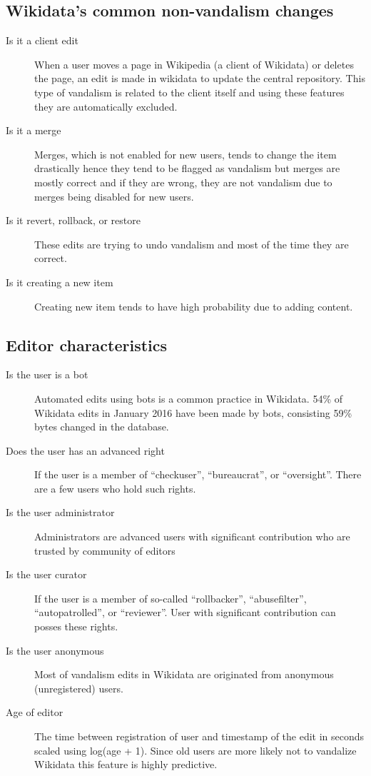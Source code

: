 \documentclass{sig-alternate}
\begin{document}
\subsection{Wikidata's common non-vandalism changes}
\begin{description}
\item[Is it a client edit] When a user moves a page in Wikipedia (a client of Wikidata) or deletes the page, an edit is made in wikidata to update the central repository. This type of vandalism is related to the client itself and using these features they are automatically excluded.
\item[Is it a merge] Merges, which is not enabled for new users, tends to change the item drastically hence they tend to be flagged as vandalism but merges are mostly correct and if they are wrong, they are not vandalism due to merges being disabled for new users.
\item[Is it revert, rollback, or restore] These edits are trying to undo vandalism and most of the time they are correct.
\item[Is it creating a new item] Creating new item tends to have high probability due to adding content.
\end{description}
\subsection{Editor characteristics}
\begin{description}
\item[Is the user is a bot]  Automated edits using bots is a common practice in Wikidata. 54\% of Wikidata edits in January 2016 have been made by bots, consisting 59\% bytes changed in the database.
\item[Does the user has an advanced right]  If the user is a member of ``checkuser'', ``bureaucrat'', or ``oversight''. There are a few users who hold such rights.
\item[Is the user administrator] Administrators are advanced users with significant contribution who are trusted by community of editors
\item[Is the user curator]  If the user is a member of so-called ``rollbacker'', ``abusefilter'', ``autopatrolled'', or ``reviewer''. User with significant contribution can posses these rights.
\item[Is the user anonymous]  Most of vandalism edits in Wikidata are originated from anonymous (unregistered) users.
\item[Age of editor] The time between registration of user and timestamp of the edit in seconds scaled using log(age + 1). Since old users are more likely not to vandalize Wikidata this feature is highly predictive.
\end{description}
\end{document}
